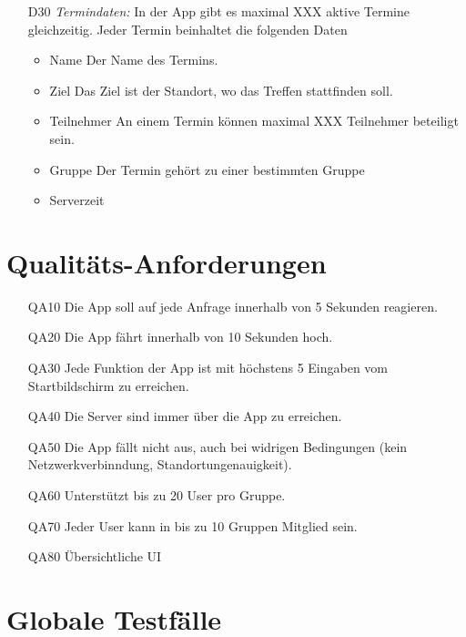 \documentclass{scrartcl}
\begin{document}
\begin{itemize}
		\item [D30] \textit{Termindaten:}
		In der App gibt es maximal XXX aktive Termine gleichzeitig. Jeder Termin beinhaltet die folgenden Daten
		\begin{itemize}
			\item Name
			\newline Der Name des Termins.
			\item Ziel
			\newline Das Ziel ist der Standort, wo das Treffen stattfinden soll.
			\item Teilnehmer
			\newline An einem Termin können maximal XXX Teilnehmer beteiligt sein. 
			\item Gruppe
			\newline Der Termin gehört zu einer bestimmten Gruppe
			\item Serverzeit
			\newline
		\end{itemize}
	\end{itemize}

	\newpage


	\section{Qualitäts-Anforderungen}
	\begin{itemize}[nosep] 
	\item[QA10] Die App soll auf jede Anfrage innerhalb von 5 Sekunden reagieren.
	\item[QA20] Die App fährt innerhalb von 10 Sekunden hoch.
	\item[QA30] Jede Funktion der App ist mit höchstens 5 Eingaben vom Startbildschirm zu erreichen.
	\item[QA40] Die Server sind immer über die App zu erreichen.
	\item[QA50] Die App fällt nicht aus, auch bei widrigen Bedingungen (kein Netzwerkverbinndung, Standortungenauigkeit).
	\item[QA60] Unterstützt bis zu 20 User pro Gruppe.
	\item[QA70] Jeder User kann in bis zu 10 Gruppen Mitglied sein.
	\item[QA80] Übersichtliche UI
	\end{itemize}

	\newpage


	\section{Globale Testfälle}
\end{document}
